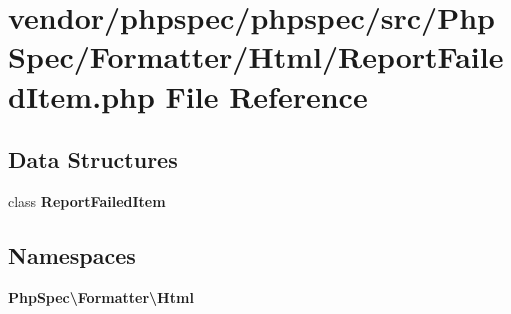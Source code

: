 \section{vendor/phpspec/phpspec/src/\+Php\+Spec/\+Formatter/\+Html/\+Report\+Failed\+Item.php File Reference}
\label{_report_failed_item_8php}
\subsection*{Data Structures}
\begin{DoxyCompactItemize}
\item 
class {\bf Report\+Failed\+Item}
\end{DoxyCompactItemize}
\subsection*{Namespaces}
\begin{DoxyCompactItemize}
\item 
 {\bf Php\+Spec\textbackslash{}\+Formatter\textbackslash{}\+Html}
\end{DoxyCompactItemize}
